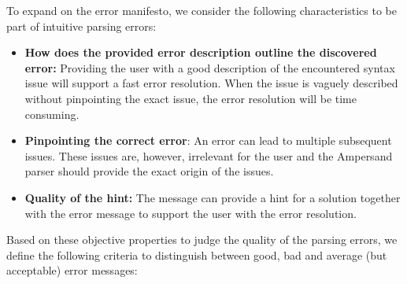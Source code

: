 \noindent
To expand on the error manifesto, we consider the following characteristics to be part of intuitive parsing errors:
\begin{itemize}
  \item	\textbf{\small How does the provided error description outline the discovered error:}
      Providing the user with a good description of the encountered syntax issue will support a fast error resolution.
      When the issue is vaguely described without pinpointing the exact issue, the error resolution will be time consuming.
  \item	\textbf{\small Pinpointing the correct error}:
      An error can lead to multiple subsequent issues.
      These issues are, however, irrelevant for the user and the Ampersand parser should provide the exact origin of the issues.
  \item	\textbf{\small Quality of the hint:}
    The message can provide a hint for a solution together with the error message to support the user with the error resolution.
\end {itemize}
%
Based on these objective properties to judge the quality of the parsing errors, we define the following criteria to distinguish between good, bad and average (but acceptable) error messages:
%
%
